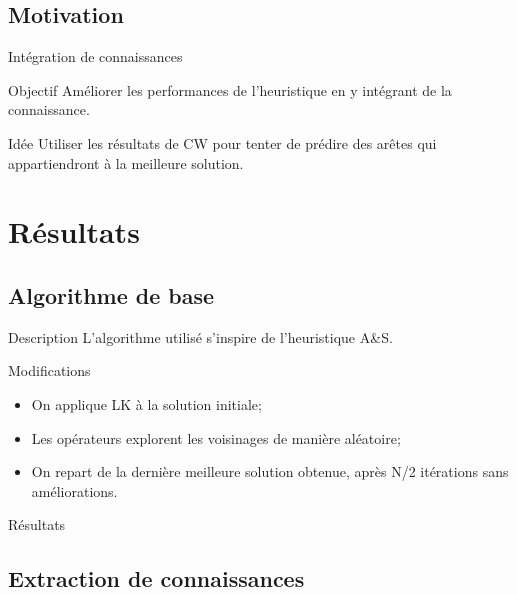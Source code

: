 \documentclass{beamer}
\begin{document}
\subsection{Motivation}

\begin{frame}{Intégration de connaissances}
\begin{block}{Objectif}
Améliorer les performances de l'heuristique en y intégrant de la connaissance.
\end{block}

\begin{exampleblock}{Idée}
Utiliser les résultats de CW pour tenter de prédire des arêtes qui appartiendront à la meilleure solution.
\end{exampleblock}
\end{frame}

\section{Résultats}

\subsection{Algorithme de base}

\begin{frame}{Description}
L'algorithme utilisé s'inspire de l'heuristique A\&S. 
\begin{block}{Modifications}
\begin{itemize}
\item On applique LK à la solution initiale;
\item Les opérateurs explorent les voisinages de manière aléatoire;
\item On repart de la dernière meilleure solution obtenue, après N/2 itérations sans améliorations.
\end{itemize}
\end{block}
\end{frame}

\begin{frame}{Résultats}

\end{frame}

\subsection{Extraction de connaissances}
\end{document}
